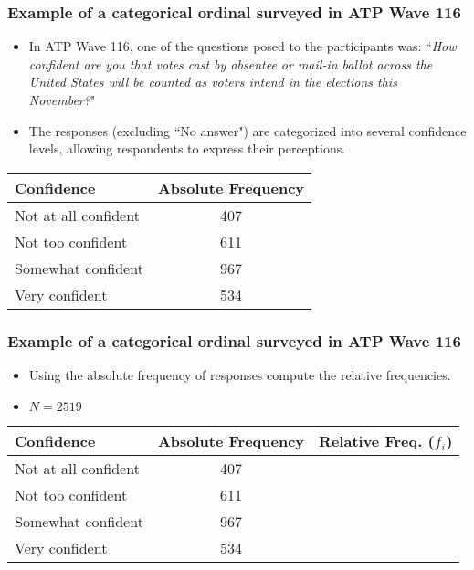 \documentclass[handout]{beamer} %
\begin{document}
\begin{frame}
\frametitle{Example of a categorical ordinal surveyed in ATP Wave 116}
\begin{itemize}
\item In ATP Wave 116, one of the questions posed to the participants was:
``\emph{How confident are you that votes cast by absentee or mail-in ballot across the United States will be counted as voters intend in the elections this November?}"
\item The responses (excluding ``No answer") are categorized into several confidence levels, allowing respondents to express their perceptions.
\end{itemize}

{\small \centering
\begin{tabular}{|l|c|}
\hline
Confidence & Absolute Frequency \\
\hline
Not at all confident & 407 \\
Not too confident & 611 \\
Somewhat confident & 967 \\
Very confident & 534 \\
\hline
\end{tabular}
\par}

\end{frame}

\begin{frame}
\frametitle{Example of a categorical ordinal surveyed in ATP Wave 116}
\begin{itemize}
\item Using the absolute frequency of responses compute the relative frequencies.
\item $N=2519$
\end{itemize}
\medskip

{\small \centering
\begin{tabular}{|l|c|c|}
\hline
Confidence & Absolute Frequency & Relative Freq. ($f_i$) \\
\hline
Not at all confident & 407 &  \\
Not too confident & 611 &  \\
Somewhat confident & 967 &  \\
Very confident & 534 &  \\
\hline
\end{tabular}
\par}

\end{frame}
\end{document}

